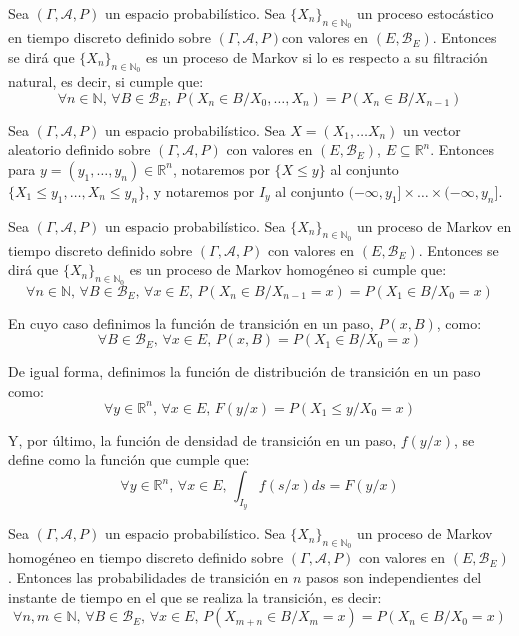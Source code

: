 \begin{definicion}
Sea $(\Gamma , \mathcal{A}, P)$ un espacio probabilístico. Sea $\{X_n\}_{n\in \mathds{N}_0}$ un proceso estocástico en tiempo discreto definido sobre $(\Gamma, \mathcal{A}, P)$con valores en $(E,\mathscr{B}_E)$. Entonces se dirá que $\{X_n\}_{n\in \mathds{N}_0}$ es un proceso de Markov si lo es respecto a su filtración natural, es decir, si cumple que:
$$\forall n \in \mathds{N}\text{, }\forall B\in \mathscr{B}_E\text{, } P(X_n\in B/X_0,\ldots , X_n) = P(X_n\in B/X_{n-1}) $$
\end{definicion}

\begin{notacion}
Sea $(\Gamma , \mathcal{A}, P)$ un espacio probabilístico. Sea $X = (X_1,\ldots X_n)$ un vector aleatorio definido sobre $(\Gamma, \mathcal{A}, P)$ con valores en $(E,\mathscr{B}_E)$, $E\subseteq \mathds{R}^n$. Entonces para $y = (y_1,\ldots ,y_n) \in\mathds{R}^n$, notaremos por $\{X\leq y\}$ al conjunto $\{X_1\leq y_1,\ldots ,X_n\leq y_n\}$, y notaremos por $I_y$ al conjunto $(-\infty ,y_1]\times\ldots\times (-\infty ,y_n]$.
\end{notacion}

\begin{definicion}
Sea $(\Gamma , \mathcal{A}, P)$ un espacio probabilístico. Sea $\{X_n\}_{n\in \mathds{N}_0}$ un proceso de Markov en tiempo discreto definido sobre $(\Gamma, \mathcal{A}, P)$ con valores en $(E,\mathscr{B}_E)$. Entonces se dirá que $\{X_n\}_{n\in \mathds{N}_0}$ es un proceso de Markov homogéneo si cumple que:
$$\forall n \in \mathds{N}\text{, }\forall B\in \mathscr{B}_E\text{, }\forall x\in E \text{, } P(X_n\in B/X_{n-1}=x) = P(X_1\in B/X_0=x) $$

En cuyo caso definimos la función de transición en un paso, $P(x,B)$, como:
$$\forall B\in \mathscr{B}_E \text{, }\forall x\in E\text{, } P(x,B) = P(X_1\in B/X_0=x) $$

De igual forma, definimos la función de distribución de transición en un paso como:
$$\forall y\in \mathds{R}^n \text{, }\forall x\in E\text{, } F(y/x) = P(X_1\leq y/X_0=x)$$

Y, por último, la función de densidad de transición en un paso, $f(y/x)$, se define como la función que cumple que:
$$\forall y\in \mathds{R}^n \text{, }\forall x\in E\text{, } \int_{I_y}f(s/x) ds = F(y/x)$$
\end{definicion}

\begin{proposicion}
Sea $(\Gamma , \mathcal{A}, P)$ un espacio probabilístico. Sea $\{X_n\}_{n\in \mathds{N}_0}$ un proceso de Markov homogéneo en tiempo discreto definido sobre $(\Gamma, \mathcal{A}, P)$ con valores en $(E,\mathscr{B}_E)$. Entonces las probabilidades de transición en $n$ pasos son independientes del instante de tiempo en el que se realiza la transición, es decir:
$$\forall n,m \in \mathds{N}\text{, }\forall B\in \mathscr{B}_E \text{, }\forall x\in E\text{, } P(X_{m+n}\in B/X_{m}=x) = P(X_n\in B/X_0=x) $$
\end{proposicion}

